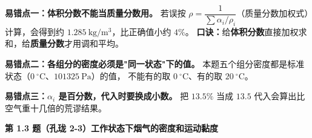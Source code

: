 \begin{yicuo}
\textbf{易错点一：体积分数不能当质量分数用。}
若误按 $\rho=\dfrac{1}{\sum\alpha_i/\rho_i}$（质量分数加权式）计算，会得到约
$1.285\ \mathrm{kg/m^3}$，比正确值小约 $4\%$。
\textbf{口诀：}给\textbf{体积分数}直接加权求和，给\textbf{质量分数}才用调和平均。

\textbf{易错点二：各组分的密度必须是"同一状态"下的值。}
本题五个组分密度都是标准状态（$0\ ^{\circ}\mathrm{C}$、$101325\ \mathrm{Pa}$）的值，
不能有的取 $0\ ^{\circ}\mathrm{C}$、有的取 $20\ ^{\circ}\mathrm{C}$。

\textbf{易错点三：$\alpha_i$ 是百分数，代入时要换成小数。}
把 $13.5\%$ 当成 $13.5$ 代入会算出比空气重十几倍的荒谬结果。
\end{yicuo}

\noindent\textbf{第 1.3 题（孔珑 2-3）\quad 工作状态下烟气的密度和运动黏度}

